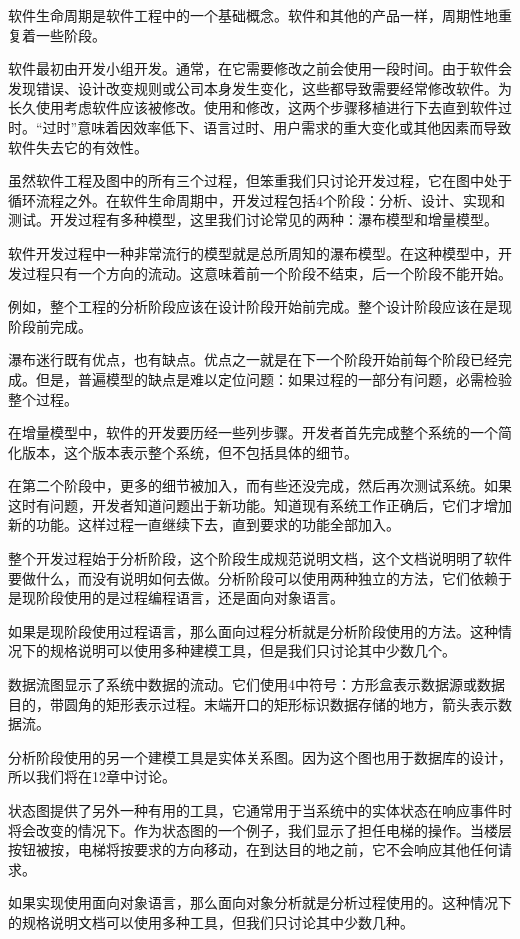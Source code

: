 软件生命周期是软件工程中的一个基础概念。软件和其他的产品一样，周期性地重复着一些阶段。

软件最初由开发小组开发。通常，在它需要修改之前会使用一段时间。由于软件会发现错误、设计改变规则或公司本身发生变化，这些都导致需要经常修改软件。为长久使用考虑软件应该被修改。使用和修改，这两个步骤移植进行下去直到软件过时。“过时”意味着因效率低下、语言过时、用户需求的重大变化或其他因素而导致软件失去它的有效性。

虽然软件工程及图中的所有三个过程，但笨重我们只讨论开发过程，它在图中处于循环流程之外。在软件生命周期中，开发过程包括4个阶段：分析、设计、实现和测试。开发过程有多种模型，这里我们讨论常见的两种：瀑布模型和增量模型。

软件开发过程中一种非常流行的模型就是总所周知的瀑布模型。在这种模型中，开发过程只有一个方向的流动。这意味着前一个阶段不结束，后一个阶段不能开始。

例如，整个工程的分析阶段应该在设计阶段开始前完成。整个设计阶段应该在是现阶段前完成。

瀑布迷行既有优点，也有缺点。优点之一就是在下一个阶段开始前每个阶段已经完成。但是，普遍模型的缺点是难以定位问题：如果过程的一部分有问题，必需检验整个过程。

在增量模型中，软件的开发要历经一些列步骤。开发者首先完成整个系统的一个简化版本，这个版本表示整个系统，但不包括具体的细节。

在第二个阶段中，更多的细节被加入，而有些还没完成，然后再次测试系统。如果这时有问题，开发者知道问题出于新功能。知道现有系统工作正确后，它们才增加新的功能。这样过程一直继续下去，直到要求的功能全部加入。

整个开发过程始于分析阶段，这个阶段生成规范说明文档，这个文档说明明了软件要做什么，而没有说明如何去做。分析阶段可以使用两种独立的方法，它们依赖于是现阶段使用的是过程编程语言，还是面向对象语言。

如果是现阶段使用过程语言，那么面向过程分析就是分析阶段使用的方法。这种情况下的规格说明可以使用多种建模工具，但是我们只讨论其中少数几个。

数据流图显示了系统中数据的流动。它们使用4中符号：方形盒表示数据源或数据目的，带圆角的矩形表示过程。末端开口的矩形标识数据存储的地方，箭头表示数据流。

分析阶段使用的另一个建模工具是实体关系图。因为这个图也用于数据库的设计，所以我们将在12章中讨论。

状态图提供了另外一种有用的工具，它通常用于当系统中的实体状态在响应事件时将会改变的情况下。作为状态图的一个例子，我们显示了担任电梯的操作。当楼层按钮被按，电梯将按要求的方向移动，在到达目的地之前，它不会响应其他任何请求。

如果实现使用面向对象语言，那么面向对象分析就是分析过程使用的。这种情况下的规格说明文档可以使用多种工具，但我们只讨论其中少数几种。
